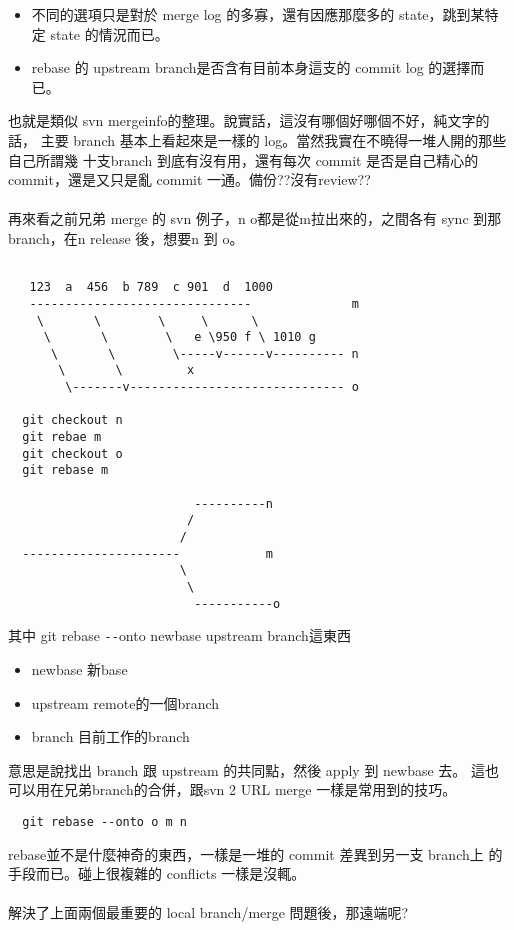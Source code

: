   \begin{itemize}
    \item 不同的選項只是對於 merge log 的多寡，還有因應那麼多的 state，跳到某特定
      state 的情況而已。
    \item rebase 的 upstream branch是否含有目前本身這支的 commit log 的選擇而已。
  \end{itemize}
  也就是類似 svn mergeinfo的整理。說實話，這沒有哪個好哪個不好，純文字的話，
  主要 branch 基本上看起來是一樣的 log。當然我實在不曉得一堆人開的那些自己所謂幾
  十支branch 到底有沒有用，還有每次 commit 是否是自己精心的 commit，還是又只是亂
  commit 一通。備份??沒有review??
  \\\\
  再來看之前兄弟 merge 的 svn 例子，n o都是從m拉出來的，之間各有 sync 到那
  branch，在n release 後，想要n 到 o。
  \begin{verbatim}

   123  a  456  b 789  c 901  d  1000
   -------------------------------              m
    \       \        \     \      \
     \       \        \   e \950 f \ 1010 g
      \       \        \-----v------v---------- n
       \       \         x
        \-------v------------------------------ o

  git checkout n
  git rebae m
  git checkout o
  git rebase m

                          ----------n
                         /
                        /
  ----------------------            m
                        \
                         \
                          -----------o
  \end{verbatim}
  其中 git rebase \verb=--=onto newbase upstream branch這東西
  \begin{itemize}
    \item newbase 新base
    \item upstream remote的一個branch
    \item branch 目前工作的branch
  \end{itemize}
  意思是說找出 branch 跟 upstream 的共同點，然後 apply 到 newbase 去。
  這也可以用在兄弟branch的合併，跟svn 2 URL merge 一樣是常用到的技巧。
  \begin{verbatim}
  git rebase --onto o m n
  \end{verbatim}
  rebase並不是什麼神奇的東西，一樣是一堆的 commit 差異到另一支 branch上 的
  手段而已。碰上很複雜的 conflicts 一樣是沒輒。
  \\\\
  解決了上面兩個最重要的 local branch/merge 問題後，那遠端呢?
